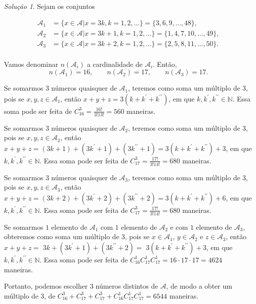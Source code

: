 \documentclass[]{book}
\theoremstyle{definition}
\theoremstyle{definition}
\theoremstyle{definition}
\theoremstyle{remark}
\newtheorem*{solution}{Solução}
\begin{document}
\begin{solution}
\iffalse{} {Solução. } \fi{}Sejam os conjuntos

\begin{align}
\mathcal{A}_1 &= \{x \in \mathcal{A} | x=3k, k=1,2,\ldots \} = \{3, 6, 9, \ldots, 48\},\\
\mathcal{A}_2 &= \{x \in \mathcal{A} | x=3k+1, k=1,2,\ldots \} = \{1, 4, 7, 10, \ldots, 49\},\\
\mathcal{A}_3 &= \{x \in \mathcal{A} | x=3k+2, k=1,2,\ldots \} = \{2, 5, 8, 11, \ldots, 50\}.\\
\end{align}

Vamos denominar \(n(\mathcal{A}_i)\) a cardinalidade de \(\mathcal{A}_i\).
Então,
\[n(\mathcal{A}_1) = 16, \qquad n(\mathcal{A}_2)=17, \qquad n(\mathcal{A}_3)=17.\]

Se somarmos \(3\) números quaisquer de \(\mathcal{A}_1\), teremos como soma um múltiplo de \(3\), pois se \(x,y,z \in \mathcal{A}_1\), então \(x+y+z = 3(k + k^{\prime} + k^{\prime\prime})\), em que \(k, k^\prime, k^{\prime\prime} \in \mathbb{N}\).
Essa soma pode ser feita de \(C^{3}_{16} = \frac{16!}{3!13!}=560\) maneiras.

Se somarmos 3 números quaisquer de \(\mathcal{A}_2\), teremos como soma um múltiplo de \(3\), pois se \(x,y,z \in \mathcal{A}_2\), então \(x+y+z =(3k+1)+(3k^{\prime}+1)+(3k^{\prime\prime}+1)=3(k + k^{\prime} + k^{\prime\prime})+3\), em que \(k, k^\prime, k^{\prime\prime} \in \mathbb{N}\).
Essa soma pode ser feita de \(C^{3}_{17} = \frac{17!}{3!14!}=680\) maneiras.

Se somarmos 3 números quaisquer de \(\mathcal{A}_3\), teremos como soma um múltiplo de \(3\), pois se \(x,y,z \in \mathcal{A}_3\), então \(x+y+z =(3k+2)+(3k^{\prime}+2)+(3k^{\prime\prime}+2)=3(k + k^{\prime} + k^{\prime\prime})+6\), em que \(k, k^\prime, k^{\prime\prime} \in \mathbb{N}\).
Essa soma pode ser feita de \(C^{3}_{17} = \frac{17!}{3!14!}=680\) maneiras.

Se somarmos \(1\) elemento de \(\mathcal{A}_1\) com \(1\) elemento de \(\mathcal{A}_2\) e com \(1\) elemento de \(\mathcal{A}_3\), obteremos como soma um múltiplo de \(3\), pois se \(x \in \mathcal{A}_1\), \(y \in \mathcal{A}_2\) e \(z \in \mathcal{A}_3\), então \(x+y+z =\) \(3k+(3k^{\prime}+1)+(3k^{\prime\prime}+2)=\) \(3(k + k^{\prime} + k^{\prime\prime})+3\), em que \(k, k^\prime, k^{\prime\prime} \in \mathbb{N}\).
Essa soma pode ser feita de \(C^{1}_{16}C^{1}_{17}C^{1}_{17} = 16 \cdot 17 \cdot 17 = 4624\) maneiras.

Portanto, podemos escolher \(3\) números distintos de \(\mathcal{A}\), de modo a obter um múltiplo de \(3\), de \(C^{3}_{16}+C^{3}_{17}+C^{3}_{17}+C^{1}_{16}C^{1}_{17}C^{1}_{17} = 6544\) maneiras.
\end{solution}
\end{document}
